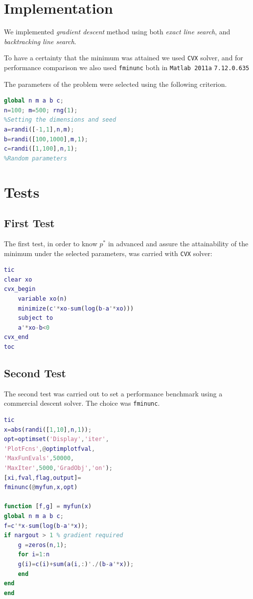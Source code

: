 \documentclass[a4paper,8pt,twocolumn]{article}
\begin{document}
\section*{Implementation}
We implemented \emph{gradient descent} method using both \emph{exact line search}, and \emph{backtracking line search}.

To have a certainty that the minimum was attained we used \texttt{CVX} solver, and for performance comparison we also used \texttt{fminunc} both in \texttt{Matlab 2011a}  \texttt{7.12.0.635}

The parameters of the problem were selected using the following criterion.

\begin{lstlisting}[language=matlab]
global n m a b c;
n=100; m=500; rng(1); 
%Setting the dimensions and seed 
a=randi([-1,1],n,m); 
b=randi([100,1000],m,1); 
c=randi([1,100],n,1);
%Random parameters
\end{lstlisting}
\section*{Tests}
\subsection*{First Test}
The first test, in order to know $p^*$ in advanced and assure the attainability of the minimum under the selected parameters, was carried with \texttt{CVX} solver:
\begin{lstlisting}[language=matlab]
tic
clear xo
cvx_begin
    variable xo(n)
    minimize(c'*xo-sum(log(b-a'*xo))) 
    subject to
    a'*xo-b<0
cvx_end
toc
\end{lstlisting}

\subsection*{Second Test}
The second test was carried out to set a performance benchmark using a commercial descent solver. The choice was \texttt{fminunc}.

\begin{lstlisting}[language=matlab]
tic
x=abs(randi([1,10],n,1));
opt=optimset('Display','iter',
'PlotFcns',@optimplotfval,
'MaxFunEvals',50000,
'MaxIter',5000,'GradObj','on');
[xi,fval,flag,output]=
fminunc(@myfun,x,opt)

function [f,g] = myfun(x)
global n m a b c;
f=c'*x-sum(log(b-a'*x));
if nargout > 1 % gradient required
    g =zeros(n,1);
    for i=1:n
    g(i)=c(i)+sum(a(i,:)'./(b-a'*x));
    end 
end 
end
\end{lstlisting}
\end{document}
